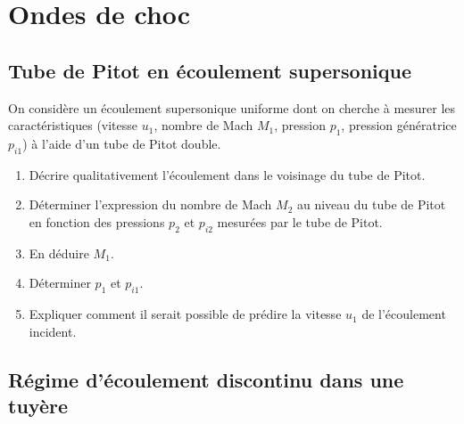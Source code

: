 
\setcounter{section}{11}

\section{Ondes de choc}


\subsection{Tube de Pitot en \'ecoulement supersonique}

On considère un \'ecoulement supersonique uniforme dont on cherche à mesurer les caract\'eristiques
(vitesse $u_1$, nombre de Mach $M_1$, pression $p_1$, pression g\'en\'eratrice $p_{i1}$) 
à l'aide d'un tube de Pitot double.
\begin{enumerate}
\item
D\'ecrire qualitativement l'\'ecoulement dans le voisinage du tube de Pitot.
\item
D\'eterminer l'expression du nombre de Mach $M_2$ au niveau du tube de Pitot en fonction
des pressions $p_2$ et $p_{i2}$ mesur\'ees par le tube de Pitot.
\item
En d\'eduire $M_1$.
\item
D\'eterminer $p_1$ et $p_{i1}$.
\item
Expliquer comment il serait possible de pr\'edire la vitesse $u_1$ de l'\'ecoulement incident. 
\end{enumerate}
 
\subsection{R\'egime d'\'ecoulement discontinu dans une tuyère}

